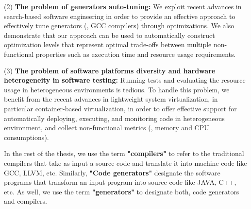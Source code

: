 	(2) \textbf{The problem of generators auto-tuning:}  
	We exploit recent advances in search-based software engineering in order to provide an effective approach to effectively tune generators (\eg, GCC compilers) through optimizations. We also demonstrate that our approach can be used to automatically construct optimization levels that represent optimal trade-offs between multiple non-functional properties such as execution time and resource usage requirements. 

	(3) \textbf{The problem of software platforms diversity and hardware heterogeneity in software testing:} Running tests and evaluating the resource usage in heterogeneous environments is tedious. To handle this problem, we benefit from the recent advances in lightweight system virtualization, in particular container-based virtualization, in order to offer effective support for automatically deploying, executing, and monitoring code in heterogeneous environment, and collect non-functional metrics (\eg, memory and CPU consumptions).
	

In the rest of the thesis, we use the term \textbf{"compilers"} to refer to the traditional compilers that take as input a source code and translate it into machine code like GCC, LLVM, etc. Similarly, \textbf{"Code generators"} designate the software programs that transform an input program into source code like JAVA, C++, etc. As well, we use the term \textbf{"generators"} to designate both, code generators and compilers. 

